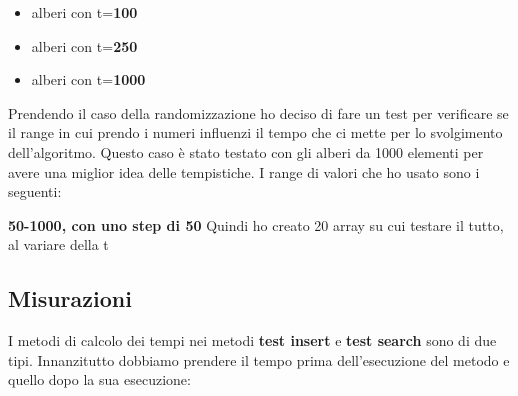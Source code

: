 \begin{itemize}
    \item alberi con t=\textbf{100}
    \item alberi con t=\textbf{250}
    \item alberi con t=\textbf{1000}
\end{itemize}

Prendendo il caso della randomizzazione ho deciso di fare un test per verificare se il range in cui prendo i numeri influenzi il tempo che ci mette per lo svolgimento dell'algoritmo. Questo caso è stato testato con gli alberi da 1000 elementi per avere una miglior idea delle tempistiche. I range di valori che ho usato sono i seguenti:

\textbf{50-1000, con uno step di 50}
Quindi ho creato 20 array su cui testare il tutto, al variare della t

\subsection{Misurazioni}
\label{sec:Misurazioni_1}
I metodi di calcolo dei tempi nei metodi \textbf{test insert} e \textbf{test search} sono di due tipi. Innanzitutto dobbiamo prendere il tempo prima dell'esecuzione del metodo e quello dopo la sua esecuzione: 

